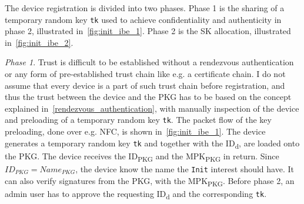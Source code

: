 The device registration is divided into two phases. 
Phase 1 is the sharing of a temporary random key \texttt{tk} used to achieve confidentiality and authenticity in phase 2, illustrated in~\autoref{fig:init_ibe_1}.
Phase 2 is the \gls{SK} allocation, illustrated in~\autoref{fig:init_ibe_2}.

\textit{Phase 1}.
Trust is difficult to be established without a rendezvous authentication or any form of pre-established trust chain like e.g. a certificate chain.
I do not assume that every device is a part of such trust chain before registration, and thus the trust between the device and the \gls{PKG} has to be based on the concept explained in~\autoref{rendezvous_authentication}, with manually inspection of the device and preloading of a temporary random key \texttt{tk}.
The packet flow of the key preloading, done over e.g. \gls{NFC}, is shown in~\autoref{fig:init_ibe_1}.
The device generates a temporary random key \texttt{tk} and together with the ID\textsubscript{d}, are loaded onto the \gls{PKG}.
The device receives the ID\textsubscript{PKG} and the MPK\textsubscript{PKG} in return.
Since $ID_{PKG} = Name_{PKG}$, the device know the \gls{name} the \texttt{Init} \gls{interest} should have.
It can also verify signatures from the \gls{PKG}, with the MPK\textsubscript{PKG}. 
Before phase 2, an admin user has to approve the requesting ID\textsubscript{d} and the corresponding \texttt{tk}.

